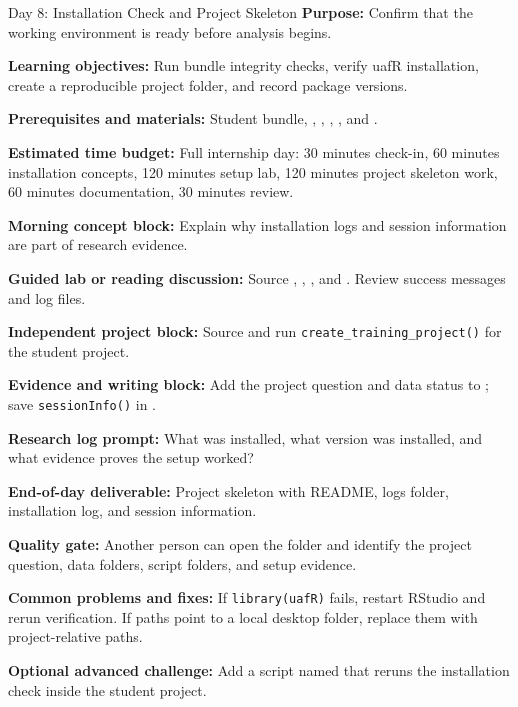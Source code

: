 \begin{dailybox}{Day 8: Installation Check and Project Skeleton}
\textbf{Purpose:} Confirm that the working environment is ready before analysis begins.

\textbf{Learning objectives:} Run bundle integrity checks, verify uafR installation, create a reproducible project folder, and record package versions.

\textbf{Prerequisites and materials:} Student bundle, , , , , and .

\textbf{Estimated time budget:} Full internship day: 30 minutes check-in, 60 minutes installation concepts, 120 minutes setup lab, 120 minutes project skeleton work, 60 minutes documentation, 30 minutes review.

\textbf{Morning concept block:} Explain why installation logs and session information are part of research evidence.

\textbf{Guided lab or reading discussion:} Source , , , and . Review success messages and log files.

\textbf{Independent project block:} Source  and run \texttt{create\_training\_project()} for the student project.

\textbf{Evidence and writing block:} Add the project question and data status to ; save \texttt{sessionInfo()} in .

\textbf{Research log prompt:} What was installed, what version was installed, and what evidence proves the setup worked?

\textbf{End-of-day deliverable:} Project skeleton with README, logs folder, installation log, and session information.

\textbf{Quality gate:} Another person can open the folder and identify the project question, data folders, script folders, and setup evidence.

\textbf{Common problems and fixes:} If \texttt{library(uafR)} fails, restart RStudio and rerun verification. If paths point to a local desktop folder, replace them with project-relative paths.

\textbf{Optional advanced challenge:} Add a script named  that reruns the installation check inside the student project.
\end{dailybox}

